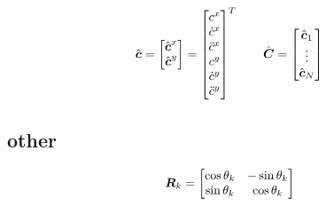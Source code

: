 \documentclass[12pt,a4paper]{article}
\begin{document}
\begin{equation*}
\hat{\mbox{\boldmath $c$}} = \begin{bmatrix} \hat{\mbox{\boldmath $c$}}^x \\ \hat{\mbox{\boldmath $c$}}^y \end{bmatrix} =
          \begin{bmatrix} c^x \\ \dot{c}^x \\ \ddot{c}^x \\ c^y \\ \dot{c}^y \\ \ddot{c}^y \end{bmatrix}^T
\quad\quad
\hat{\mbox{\boldmath $C$}} = \begin{bmatrix} \hat{\mbox{\boldmath $c$}}_1 \\ \vdots \\ \hat{\mbox{\boldmath $c$}}_N \end{bmatrix}\\
\end{equation*}



\subsection{other}
\begin{equation*}
\mbox{\boldmath $R$}_k = 
\begin{bmatrix}
    \cos{\theta_k}  &   -\sin{\theta_k} \\
    \sin{\theta_k}  &   \cos{\theta_k} \\
\end{bmatrix}
\end{equation*}













\end{document}
